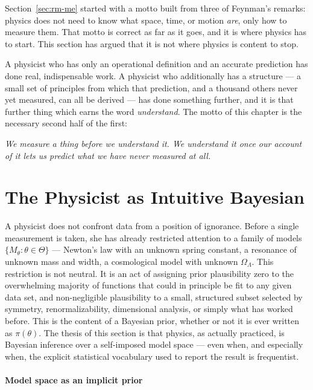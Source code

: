 Section~\ref{sec:rm-me} started with a motto built from three of
Feynman's remarks: physics
does not need to know what space, time, or motion \emph{are}, only how to
measure them. That motto is correct as far as it goes, and it is where physics
has to start. This section has argued that it is not where physics is content
to stop.

A physicist who has only an operational definition and an accurate prediction
has done real, indispensable work. A
physicist who additionally has a structure --- a small set of principles from
which that prediction, and a thousand others never yet measured, can all be
derived --- has done something further, and it is that further thing which
earns the word \emph{understand}. The motto of this chapter is the necessary
second half of the first:

\emph{We measure a thing before we understand it. We understand it once our
account of it lets us predict what we have never measured at all.}


\section{The Physicist as Intuitive Bayesian}
\label{sec:rm-pib}

A physicist does not confront data from a position of ignorance. Before a
single measurement is taken, she has already restricted attention to a family
of models $\{M_\theta : \theta \in \Theta\}$ --- Newton's law with an unknown
spring constant, a resonance of unknown mass and width, a cosmological model
with unknown $\Omega_\Lambda$. This restriction is not neutral. It is an act of
assigning prior plausibility zero to the overwhelming majority of functions
that could in principle be fit to any given data set, and non-negligible
plausibility to a small, structured subset selected by symmetry,
renormalizability, dimensional analysis, or simply what has worked before. This
is the content of a Bayesian prior, whether or not it is ever written as
$\pi(\theta)$. The thesis of this section is that physics, as actually
practiced, is Bayesian inference over a self-imposed model space --- even when,
and especially when, the explicit statistical vocabulary used to report the
result is frequentist.

\paragraph{Model space as an implicit prior}

